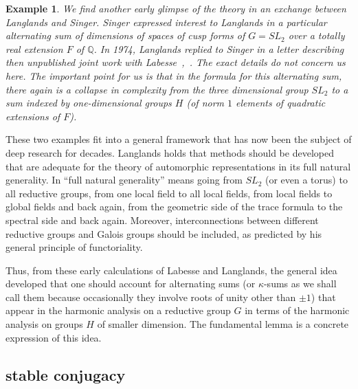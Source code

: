 \documentclass[brochure,english,12pt]{bourbaki}
\newtheorem{example}[equation]{Example}
\newcommand{\ring}[1]{\mathbb{#1}}
\begin{document}
\begin{example}
  We find another early glimpse of the theory in an exchange
  between Langlands and Singer.  Singer expressed interest to
  Langlands in a particular alternating sum of dimensions of spaces of
  cusp forms of $G=SL_2$ over a totally real extension $F$ of
  $\ring{Q}$.  In 1974, Langlands replied to Singer in a letter
  describing then unpublished joint work with
  Labesse~\cite{Singer},~\cite{LL}.  The exact details do not concern
  us here.  The important point for us is that in the formula for this
  alternating sum, there again is a collapse in complexity from the
  three dimensional group $SL_2$ to a sum indexed by one-dimensional
  groups $H$ (of norm $1$ elements of quadratic extensions of $F$).
\end{example}

These two examples fit into a general framework that has now been the
subject of deep research for decades.  Langlands holds that methods
should be developed that are adequate for the theory of automorphic
representations in its full natural generality.  In ``full natural
generality'' means going from $SL_2$ (or even a torus) to all
reductive groups, from one local field to all local fields, from local
fields to global fields and back again, from the geometric side of the
trace formula to the spectral side and back again.  Moreover,
interconnections between different reductive groups and Galois groups
should be included, as predicted by his general principle of
functoriality.


Thus, from these early calculations of Labesse and Langlands, the
general idea developed that one should account for alternating sums
(or $\kappa$-sums as we shall call them because occasionally they
involve roots of unity other than $\pm1$) that appear in the harmonic
analysis on a reductive group $G$ in terms of the harmonic analysis on
groups $H$ of smaller dimension.  The fundamental lemma is a concrete
expression of this idea.


\subsection{stable conjugacy}
\end{document}

